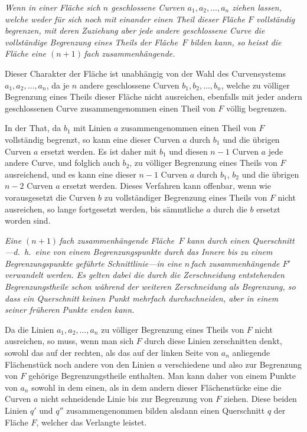 \documentclass[a4paper,12pt,leqno]{article}
\begin{document}
{\itshape
\label{`mehrfachzusammenhaengende'}
Wenn in einer
Fl\"{a}che sich $n$ geschlossene Curven
$a_1, a_2,\ldots, a_n$
ziehen lassen, welche weder f\"{u}r sich noch mit einander einen
Theil dieser Fl\"{a}che $F$ vollst\"{a}ndig begrenzen, mit deren
Zuziehung aber jede andere geschlossene Curve die
vollst\"{a}ndige Begrenzung eines Theils der Fl\"{a}che~$F$
bilden kann, so heisst die Fl\"{a}che eine ${(n + 1)} \,$\-fach
zusammenh\"{a}ngende.}

Dieser Charakter der Fl\"{a}che ist unabh\"{a}ngig von der Wahl
des Curvensystems $a_1, a_2,\ldots, a_n$, da je $n$ andere
geschlossene Curven $b_1, b_2,\ldots, b_n$, welche zu
v\"{o}lliger Begrenzung eines Theils dieser Fl\"{a}che nicht
ausreichen, ebenfalls mit jeder andern geschlossenen Curve
zusammengenommen einen Theil von $F$ v\"{o}llig begrenzen.

In der That, da $b_1$ mit Linien $a$ zusammengenommen einen Theil
von $F$ vollst\"{a}ndig begrenzt, so kann eine dieser Curven $a$
durch $b_1$ und die \"{u}brigen Curven $a$ ersetzt werden.  Es
ist daher mit $b_1$ und diesen $n - 1$ Curven $a$ jede andere
Curve, und folglich auch $b_2$, zu v\"{o}lliger Begrenzung eines
Theils von $F$ ausreichend, und es kann eine dieser $n - 1$
Curven $a$ durch $b_1$, $b_2$ und die \"{u}brigen $n - 2$ Curven
$a$ ersetzt werden.  Dieses Verfahren kann offenbar, wenn wie
vorausgesetzt die Curven $b$ zu vollst\"{a}ndiger Begrenzung
eines Theils von $F$ nicht ausreichen, so lange fortgesetzt
werden, bis s\"{a}mmtliche $a$ durch die $b$ ersetzt worden sind.

{\itshape
Eine ${(n + 1)} \,$\-fach zusammenh\"{a}ngende Fl\"{a}che~$F$ kann
durch einen Quer\-schnitt---d.~h.\ eine von einem
Begrenzungspunkte durch das Innere bis zu einem Begrenzungspunkte
gef\"{u}hrte Schnittlinie---in eine $n \,$\-fach
zusammenh\"{a}ngende $F'$ verwandelt werden.  Es gelten dabei die
durch die Zerschneidung entstehenden Begrenzungstheile schon
w\"{a}hrend der weiteren Zerschneidung als Begrenzung, so dass
ein Querschnitt keinen Punkt mehrfach durchschneiden, aber in
einem seiner fr\"{u}heren Punkte enden kann.}

Da die Linien $a_1, a_2,\ldots, a_n$ zu v\"{o}lliger Begrenzung
eines Theils von $F$ nicht ausreichen, so muss, wenn man sich $F$
durch diese Linien zerschnitten denkt, sowohl das auf der
rechten, als das auf der linken Seite von $a_n$ anliegende
Fl\"{a}chenst\"{u}ck noch andere von den Linien $a$ verschiedene
und also zur Begrenzung von $F$ geh\"{o}rige Begrenzungstheile
enthalten.  Man kann daher von einem Punkte von $a_n$ sowohl in
dem einen, als in dem andern dieser Fl\"{a}chenst\"{u}cke eine
die Curven $a$ nicht schneidende Linie bis zur Begrenzung von $F$
ziehen.  Diese beiden Linien $q'$ und $q''$ zusammengenommen
bilden alsdann einen Querschnitt $q$ der Fl\"{a}che $F$, welcher
das Verlangte leistet.
\end{document}

